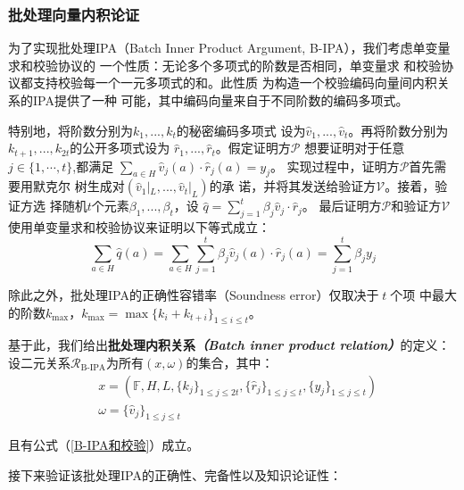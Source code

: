 \documentclass[zihao=-4]{ctexart}
\begin{document}
\subsubsection{批处理向量内积论证}
为了实现批处理IPA（Batch Inner Product Argument, B-IPA），我们考虑单变量求和校验协议的
一个性质：无论多个多项式的阶数是否相同，单变量求
和校验协议都支持校验每一个一元多项式的和\cite{six}。此性质
为构造一个校验编码向量间内积关系的IPA提供了一种
可能，其中编码向量来自于不同阶数的编码多项式。\par
特别地，将阶数分别为$k_1,...,k_t$的秘密编码多项式
设为$\hat{v}_1,...,\hat{v}_t$。再将阶数分别为
$k_{t+1},...,k_{2t}$的公开多项式设为
$\hat{r}_1,...,\hat{r}_t$。假定证明方$\mathcal{P}$
想要证明对于任意$j \in \{1,\cdots,t\}$,都满足
$\sum_{a\in H}\hat{v}_j(a)\cdot\hat{r}_j(a)=y_j$。
实现过程中，证明方$\mathcal{P}$首先需要用默克尔
树生成对$(\hat{v}_1|_L,...,\hat{v}_t|_L)$的承
诺，并将其发送给验证方$\mathcal{V}$。接着，验证方选
择随机$t$个元素$\beta_1,...,\beta_t$，设
$\hat{q}=\sum\limits_{j=1}^t\beta_j\hat{v}_j\cdot\hat{r}_j$。
最后证明方$\mathcal{P}$和验证方$\mathcal{V}$
使用单变量求和校验协议来证明以下等式成立：
\begin{equation}\sum_{a\in H}\hat{q}(a)=\sum_{a\in H}\sum\limits_{j=1}^t\beta_j\hat{v}_j(a)\cdot\hat{r}_j(a)=\sum\limits_{j=1}^t\beta_jy_j\label{B-IPA和校验}\end{equation}\par
除此之外，批处理IPA的正确性容错率（Soundness error）仅取决于$\;t\;$个项
中最大的阶数$k_{\max}$，$k_{\max}=\max\{k_i+k_{t+i}\}_{1\le i\le t}$。\par
基于此，我们给出\textbf{批处理内积关系\emph{（Batch inner product relation）}}的定义：设二元关系$\mathcal{R}_{\text{B-IPA}}$为所有$(x,\omega)$的集合，其中：
\[\begin{aligned}&x=(\mathbb{F},H,L,\{k_j\}_{1\le j\le2t},\{\hat{r}_j\}_{1\le j\le t},\{y_j\}_{1\le j\le t})\\&\omega=\{\hat{v}_j\}_{1\le j\le t}\end{aligned}\]\par
且有公式（\ref{B-IPA和校验}）成立。\par
接下来验证该批处理IPA的正确性、完备性以及知识论证性：\par
\end{document}
